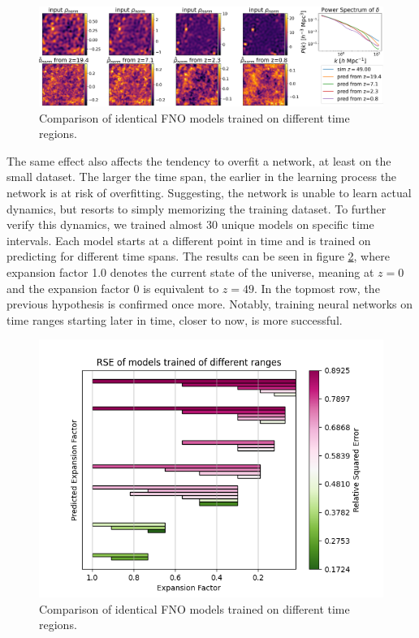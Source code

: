 \documentclass{article}
\begin{document}
\begin{figure}[h]
    \centering
    \includegraphics[width=0.9\linewidth]{img/compare_larger_scales.png}
    \caption{Comparison of identical FNO models trained on different time regions.}
    \label{fig:IC-comp}
\end{figure}

The same effect also affects the tendency to overfit a network, at least on the small dataset. The larger the time span, the earlier in the learning process the network is at risk of overfitting. Suggesting, the network is unable to learn actual dynamics, but resorts to simply memorizing the training dataset. To further verify this dynamics, we trained almost 30 unique models on specific time intervals. Each model starts at a different point in time and is trained on predicting for different time spans. The results can be seen in figure \ref{fig:ranges}, where expansion factor 1.0 denotes the current state of the universe, meaning at $z = 0$ and the expansion factor 0 is equivalent to $z=49$. In the topmost row, the previous hypothesis is confirmed once more. Notably, training neural networks on time ranges starting later in time, closer to now, is more successful.

\begin{figure}[h]
    \centering
    \includegraphics[width=0.7\linewidth]{img/ranges.png}
    \caption{Comparison of identical FNO models trained on different time regions.}
    \label{fig:ranges}
\end{figure}
\end{document}

